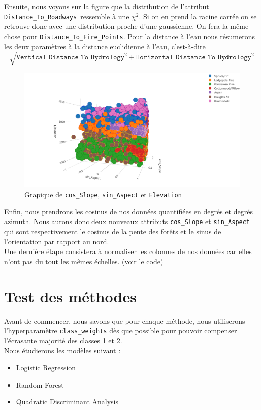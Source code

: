\documentclass[12pt,a4paper]{article}
\numberwithin{equation}{section}
\newcommand{\elevation}{\texttt{Elevation}}
\newcommand{\hhydro}{\texttt{Horizontal\_Distance\_To\_Hydrology}}
\newcommand{\vhydro}{\texttt{Vertical\_Distance\_To\_Hydrology}}
\newcommand{\roadways}{\texttt{Distance\_To\_Roadways}}
\newcommand{\fire}{\texttt{Distance\_To\_Fire\_Points}}
\begin{document}
	Ensuite, nous voyons sur la figure que la distribution de l'attribut \roadways \ ressemble à une $\chi^2$. Si on en prend la racine carrée on se retrouve donc avec une distribution proche d'une gaussienne. On fera la même chose pour \fire . Pour la distance à l'eau nous résumerons les deux paramètres à la distance euclidienne à l'eau, c'est-à-dire $$ \sqrt{\vhydro^2 + \hhydro^2}$$
	
	\begin{figure}[h]
		\centering
		\includegraphics[width=.8\linewidth]{img/sin_aspect}
		\caption{Grapique de \texttt{cos\_Slope}, \texttt{sin\_Aspect} et \elevation}
	\end{figure}
	
	Enfin, nous prendrons les cosinus de nos données quantifiées en degrés et degrés azimuth. Nous aurons donc deux nouveaux attributs \texttt{cos\_Slope} et \texttt{sin\_Aspect} qui sont respectivement le cosinus de la pente des forêts et le sinus de l'orientation par rapport au nord. \\
	
	Une dernière étape consistera à normaliser les colonnes de nos données car elles n'ont pas du tout les mêmes échelles. (voir le code)
	
	\section{Test des méthodes}
	Avant de commencer, nous savons que pour chaque méthode, nous utiliserons l'hyperparamètre \texttt{class\_weights} dès que possible pour pouvoir compenser l'écrasante majorité des classes 1 et 2.\\
	
	Nous étudierons les modèles suivant : 
	
	\begin{itemize}
		\item Logistic Regression
		\item Random Forest
		\item Quadratic Discriminant Analysis
	\end{itemize}
	
\end{document}
